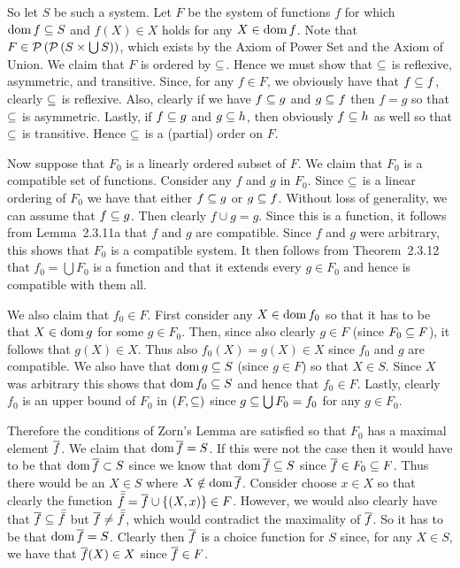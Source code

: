 \begin{questions}
{{    So let $S$ be such a system.
    Let $F$ be the system of functions $f$ for which $\dom{f} \ss S$ and $f(X) \in X$ holds for any $X \in \dom{f}$.
    Note that $F \in \pset{\pset{S \times \bigcup S}}$, which exists by the Axiom of Power Set and the Axiom of Union.
    We claim that $F$ is ordered by $\ss$.
    Hence we must show that $\ss$ is reflexive, asymmetric, and transitive.
    Since, for any $f \in F$, we obviously have that $f \ss f$, clearly $\ss$ is reflexive.
    Also, clearly if we have $f \ss g$ and $g \ss f$ then $f=g$ so that $\ss$ is asymmetric.
    Lastly, if $f \ss g$ and $g \ss h$, then obviously $f \ss h$ as well so that $\ss$ is transitive.
    Hence $\ss$ is a (partial) order on $F$.

    Now suppose that $F_0$ is a linearly ordered subset of $F$.
    We claim that $F_0$ is a compatible set of functions.
    Consider any $f$ and $g$ in $F_0$.
    Since $\ss$ is a linear ordering of $F_0$ we have that either $f \ss g$ or $g \ss f$.
    Without loss of generality, we can assume that $f \ss g$.
    Then clearly $f \cup g = g$.
    Since this is a function, it follows from Lemma~2.3.11a that $f$ and $g$ are compatible.
    Since $f$ and $g$ were arbitrary, this shows that $F_0$ is a compatible system.
    It then follows from Theorem~2.3.12 that $f_0 = \bigcup F_0$ is a function and that it extends every $g \in F_0$ and hence is compatible with them all.

    We also claim that $f_0 \in F$.
    First consider any $X \in \dom{f_0}$ so that it has to be that $X \in \dom{g}$ for some $g \in F_0$.
    Then, since also clearly $g \in F$ (since $F_0 \ss F$), it follows that $g(X) \in X$.
    Thus also $f_0(X) = g(X) \in X$ since $f_0$ and $g$ are compatible.
    We also have that $\dom{g} \ss S$ (since $g \in F$) so that $X \in S$.
    Since $X$ was arbitrary this shows that $\dom{f_0} \ss S$ and hence that $f_0 \in F$.
    Lastly, clearly $f_0$ is an upper bound of $F_0$ in $(F, \ss)$ since $g \ss \bigcup F_0 = f_0$ for any $g \in F_0$.

    Therefore the conditions of Zorn's Lemma are satisfied so that $F_0$ has a maximal element $\fb$.
    We claim that $\dom{\fb} = S$.
    If this were not the case then it would have to be that $\dom{\fb} \pss S$ since we know that $\dom{\fb} \ss S$ since $\fb \in F_0 \ss F$.
    Thus there would be an $X \in S$ where $X \notin \dom{\fb}$.
    Consider choose $x \in X$ so that clearly the function $\fbb = \fb \cup \braces{(X, x)} \in F$.
    However, we would also clearly have that $\fb \ss \fbb$ but $\fb \neq \fbb$, which would contradict the maximality of $\fb$.
    So it has to be that $\dom{\fb} = S$.
    Clearly then $\fb$ is a choice function for $S$ since, for any $X \in S$, we have that $\fb(X) \in X$ since $\fb \in F$.
  }
}

\end{questions}

